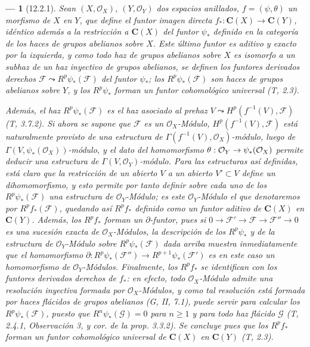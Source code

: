 \documentclass[10pt,oneside,openany]{book}
\theoremstyle{egaenv}\newtheorem*{env}{---}
\theoremstyle{egastatement}
\theoremstyle{egadescription}
\renewcommand{\geq}{\geqslant}
\renewcommand{\to}{\mathchoice{\longrightarrow}{\rightarrow}{\rightarrow}{\rightarrow}}
\begin{document}
\begin{env}[12.2.1]
\label{0.12.2.1-fr}
Sean $(X,\mathcal O_X)$, $(Y,\mathcal O_Y)$ dos espacios anillados,
$f=(\psi,\theta)$ un morfismo de $X$ en $Y$, que define el funtor
\emph{imagen directa}
$f_*:\boldsymbol{C}(X)\longrightarrow\boldsymbol{C}(Y)$,
idéntico además a la restricción a $\boldsymbol{C}(X)$ del funtor $\psi_*$ definido
en la categoría de los haces de grupos abelianos sobre $X$. Este último
funtor es aditivo y exacto por la izquierda, y como todo haz de grupos
abelianos sobre $X$ es isomorfo a un subhaz de un haz \emph{inyectivo} de
grupos abelianos, se definen los \emph{funtores derivados} derechos
$\mathcal F\leadsto R^p\psi_*(\mathcal F)$ del funtor $\psi_*$; los
$R^p\psi_*(\mathcal F)$ son haces de grupos abelianos sobre $Y$, y
los $R^p\psi_*$ forman un \emph{funtor cohomológico universal} (T, 2.3).

Además, el haz $R^p\psi_*(\mathcal F)$ es el haz asociado al
prehaz $V\leadsto H^p(f^{-1}(V),\mathcal F)$ (T, 3.7.2). Si ahora
se supone que $\mathcal F$ es un $\mathcal O_X$-\emph{Módulo},
$H^p(f^{-1}(V),\mathcal F)$ está naturalmente provisto de una estructura de
$\Gamma(f^{-1}(V),\mathcal O_X)$-módulo, luego de
$\Gamma(V,\psi_*(\mathcal O_X))$-módulo, y el dato del homomorfismo
$\theta:\mathcal O_Y\to\psi_*(\mathcal O_X)$ permite deducir una
estructura de $\Gamma(V,\mathcal O_Y)$-módulo. Para las estructuras así
definidas, está claro que la restricción de un abierto $V$ a un abierto
$V'\subset V$ define un dihomomorfismo, y esto permite por tanto definir sobre
cada uno de los $R^p\psi_*(\mathcal F)$ una estructura de $\mathcal O_Y$-\emph{Módulo};
es este $\mathcal O_Y$-Módulo el que denotaremos por $R^p f_*(\mathcal F)$,
quedando así $R^p f_*$ definido como un funtor aditivo de $\boldsymbol{C}(X)$ en
$\boldsymbol{C}(Y)$. Además, los $R^p f_*$ forman un \emph{$\partial$-funtor}, pues si
$0\longrightarrow\mathcal F'\longrightarrow\mathcal F
\longrightarrow\mathcal F''\longrightarrow0$
es una sucesión exacta de $\mathcal O_X$-Módulos, la descripción de los
$R^p\psi_*$ y de la estructura de $\mathcal O_Y$-Módulo sobre
$R^p\psi_*(\mathcal F)$ dada arriba muestra inmediatamente que
el homomorfismo
$\partial:R^p\psi_*(\mathcal F'')\longrightarrow
R^{p+1}\psi_*(\mathcal F')$
es en este caso un homomorfismo de $\mathcal O_Y$-\emph{Módulos}. Finalmente, los
$R^p f_*$ se identifican con los funtores \emph{derivados} derechos de $f_*$: en efecto,
todo $\mathcal O_X$-Módulo admite una resolución \emph{inyectiva} formada por
$\mathcal O_X$-Módulos, y como tal resolución está formada por haces
\emph{flácidos} de grupos abelianos (G, II, 7.1), puede servir para calcular los
$R^p\psi_*(\mathcal F)$, puesto que $R^n\psi_*(\mathcal G)=0$ para $n\geq1$ y
para todo haz \emph{flácido} $\mathcal G$ (T, 2.4.1, Observación 3, y cor. de la
prop. 3.3.2). Se concluye pues que los $R^p f_*$ forman un \emph{funtor
cohomológico universal de} $\boldsymbol{C}(X)$ en $\boldsymbol{C}(Y)$ (T, 2.3).
\end{env}
\end{document}

